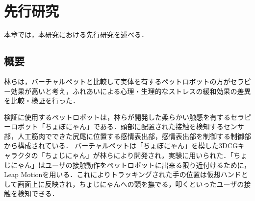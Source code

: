 ﻿\chapter{先行研究}
本章では，本研究における先行研究を述べる．

\section{概要}
林ら\cite{biblabel1}は，バーチャルペットと比較して実体を有するペットロボットの方がセラピー効果が高いと考え，ふれあいによる心理・生理的なストレスの緩和効果の差異を比較・検証を行った．

検証に使用するペットロボットは，林らが開発した柔らかい触感を有するセラピーロボット「ちょぼにゃん」である．頭部に配置された接触を検知するセンサ部，人工筋肉でできた尻尾に位置する感情表出部，感情表出部を制御する制御部から構成されている．
バーチャルペットは「ちょぼにゃん」を模した3DCGキャラクタの「ちょじにゃん」が林らにより開発され，実験に用いられた．「ちょじにゃん」はユーザの接触動作をペットロボットに出来る限り近付けるために，Leap Motionを用いる．これによりトラッキングされた手の位置は仮想ハンドとして画面上に反映され，ちょじにゃんへの頭を撫でる，叩くといったユーザの接触を検知できる．

